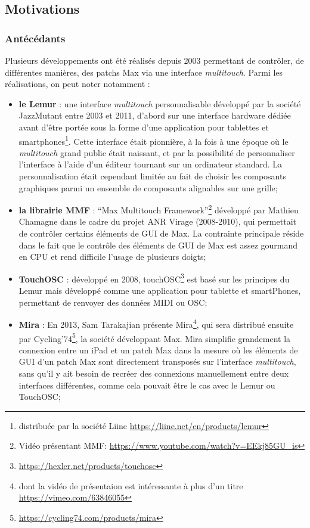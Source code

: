 \subsection{Motivations}

\subsubsection{Antécédants} 

\noindent Plusieurs développements ont été réalisés depuis 2003 permettant de contrôler, de différentes manières, des patchs Max via une interface \textit{multitouch}. Parmi les réalisations, on peut noter notamment :
\vspace{-1em}
\begin{itemize}[noitemsep]
	\item \textbf{le Lemur} : une interface \textit{multitouch} personnalisable développé par la société JazzMutant entre 2003 et 2011, d'abord sur une interface hardware dédiée avant d'être portée sous la forme d'une application pour tablettes et smartphones\footnote{distribuée par la société Liine \url{https://liine.net/en/products/lemur}}. Cette interface était pionnière, à la fois à une époque où le \textit{multitouch} grand public était naissant, et par la possibilité de personnaliser l'interface à l'aide d'un éditeur tournant sur un ordinateur standard. La personnalisation était cependant limitée au fait de choisir les composants graphiques parmi un ensemble de composants alignables sur une grille;

	\item \textbf{la librairie MMF} : ``Max Multitouch Framework''\footnote{Vidéo présentant MMF: \url{https://www.youtube.com/watch?v=EEkj85GU_is}} développé par Mathieu Chamagne dans le cadre du projet \gls{ANR} Virage (2008-2010), qui permettait de contrôler certains éléments de \gls{GUI} de Max. La contrainte principale réside dans le fait que le contrôle des éléments de \gls{GUI} de Max est assez gourmand en \gls{CPU} et rend difficile l'usage de plusieurs doigts;

	\item \textbf{TouchOSC} : développé en 2008, touchOSC\footnote{\url{https://hexler.net/products/touchosc}} est basé sur les principes du Lemur mais développé comme une application pour tablette et smartPhones, permettant de renvoyer des données \gls{MIDI} ou \gls{OSC};

	\item \textbf{Mira} : En 2013, Sam Tarakajian présente Mira\footnote{dont la vidéo de présentaion est intéressante à plus d'un titre \url{https://vimeo.com/63846055}}, qui sera distribué ensuite par Cycling'74\footnote{\url{https://cycling74.com/products/mira}}, la société développant Max. Mira simplifie grandement la connexion entre un iPad et un patch Max dans la mesure où les éléments de \gls{GUI} d'un patch Max sont directement transposés sur l'interface \textit{multitouch}, sans qu'il y ait besoin de recréer des connexions manuellement entre deux interfaces différentes, comme cela pouvait être le cas avec le Lemur ou TouchOSC;


\end{itemize}
